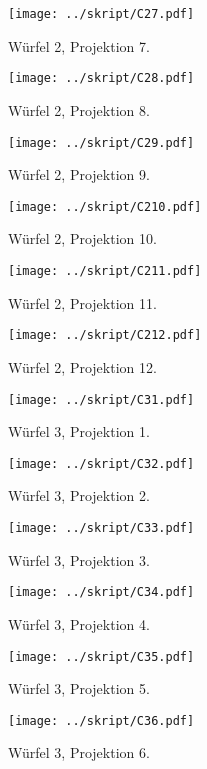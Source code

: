 \begin{figure}[htbp]
	\begin{minipage}{0.5\textwidth}
	\texttt{[image: ../skript/C27.pdf]}
	\caption{Würfel 2, Projektion 7.}
	\end{minipage}
	\hfill
	\begin{minipage}{0.5\textwidth}
	\texttt{[image: ../skript/C28.pdf]}
	\caption{Würfel 2, Projektion 8.}
	\end{minipage}
\end{figure}

\begin{figure}[htbp]
	\begin{minipage}{0.5\textwidth}
	\texttt{[image: ../skript/C29.pdf]}
	\caption{Würfel 2, Projektion 9.}
	\end{minipage}
	\hfill
	\begin{minipage}{0.5\textwidth}
	\texttt{[image: ../skript/C210.pdf]}
	\caption{Würfel 2, Projektion 10.}
	\end{minipage}
\end{figure}
\clearpage
\begin{figure}[htbp]
	\begin{minipage}{0.5\textwidth}
	\texttt{[image: ../skript/C211.pdf]}
	\caption{Würfel 2, Projektion 11.}
	\end{minipage}
	\hfill
	\begin{minipage}{0.5\textwidth}
	\texttt{[image: ../skript/C212.pdf]}
	\caption{Würfel 2, Projektion 12.}
	\end{minipage}
\end{figure}

\begin{figure}[htbp]
	\begin{minipage}{0.5\textwidth}
	\texttt{[image: ../skript/C31.pdf]}
	\caption{Würfel 3, Projektion 1.}
	\end{minipage}
	\hfill
	\begin{minipage}{0.5\textwidth}
	\texttt{[image: ../skript/C32.pdf]}
	\caption{Würfel 3, Projektion 2.}
	\end{minipage}
\end{figure}

\begin{figure}[htbp]
	\begin{minipage}{0.5\textwidth}
	\texttt{[image: ../skript/C33.pdf]}
	\caption{Würfel 3, Projektion 3.}
	\end{minipage}
	\hfill
	\begin{minipage}{0.5\textwidth}
	\texttt{[image: ../skript/C34.pdf]}
	\caption{Würfel 3, Projektion 4.}
	\end{minipage}
\end{figure}
\clearpage
\begin{figure}[htbp]
	\begin{minipage}{0.5\textwidth}
	\texttt{[image: ../skript/C35.pdf]}
	\caption{Würfel 3, Projektion 5.}
	\end{minipage}
	\hfill
	\begin{minipage}{0.5\textwidth}
	\texttt{[image: ../skript/C36.pdf]}
	\caption{Würfel 3, Projektion 6.}
	\end{minipage}
\end{figure}


